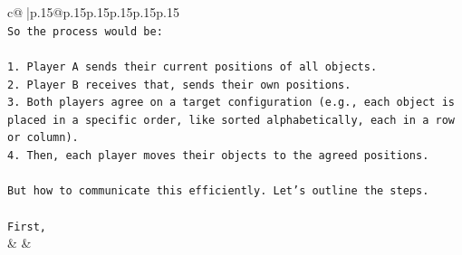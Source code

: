 \documentclass{article}
\begin{document}
{\begin{supertabular}{c@{$\;$}|p{.15\linewidth}@{}p{.15\linewidth}p{.15\linewidth}p{.15\linewidth}p{.15\linewidth}p{.15\linewidth}}
{{{\\ 
\texttt{So the process would be:} \\
\\ 
\texttt{1. Player A sends their current positions of all objects.} \\
\texttt{2. Player B receives that, sends their own positions.} \\
\texttt{3. Both players agree on a target configuration (e.g., each object is placed in a specific order, like sorted alphabetically, each in a row or column).} \\
\texttt{4. Then, each player moves their objects to the agreed positions.} \\
\\ 
\texttt{But how to communicate this efficiently. Let's outline the steps.} \\
\\ 
\texttt{First,} \\
            }
        }
    }
    & & \\ \\


\end{supertabular}}
\end{document}
